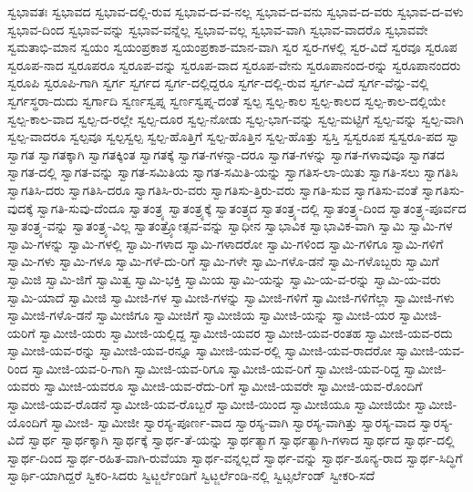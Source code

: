 {ಸ್ವಭಾವತಃ
ಸ್ವಭಾವದ
ಸ್ವಭಾವ-ದಲ್ಲಿ-ರುವ
ಸ್ವಭಾವ-ದ-ವ-ನಲ್ಲ
ಸ್ವಭಾವ-ದ-ವನು
ಸ್ವಭಾವ-ದ-ವರು
ಸ್ವಭಾವ-ದ-ವಳು
ಸ್ವಭಾವ-ದಿಂದ
ಸ್ವಭಾವ-ವನ್ನು
ಸ್ವಭಾವ-ವನ್ನೆಲ್ಲ
ಸ್ವಭಾವ-ವಲ್ಲ
ಸ್ವಭಾವ-ವಾಗಿ
ಸ್ವಭಾವ-ವಾದರೊ
ಸ್ವಭಾವವೇ
ಸ್ವಮತಾಭಿ-ಮಾನ
ಸ್ವಯಂ
ಸ್ವಯಂಪ್ರಕಾಶ
ಸ್ವಯಂಪ್ರಕಾಶ-ಮಾನ-ವಾಗಿ
ಸ್ವರ
ಸ್ವರ-ಗಳಲ್ಲಿ
ಸ್ವರ-ವಿದೆ
ಸ್ವರವೂ
ಸ್ವರೂಪ
ಸ್ವರೂಪ-ನಾದ
ಸ್ವರೂಪರೂ
ಸ್ವರೂಪ-ವನ್ನು
ಸ್ವರೂಪ-ವಾದ
ಸ್ವರೂಪ-ವೇನು
ಸ್ವರೂಪಾನಂದ-ರನ್ನು
ಸ್ವರೂಪಾನಂದರು
ಸ್ವರೂಪಿ
ಸ್ವರೂಪಿ-ಗಾಗಿ
ಸ್ವರ್ಗ
ಸ್ವರ್ಗದ
ಸ್ವರ್ಗ-ದಲ್ಲಿದ್ದರೂ
ಸ್ವರ್ಗ-ದಲ್ಲಿ-ರುವ
ಸ್ವರ್ಗ-ವಿದೆ
ಸ್ವರ್ಗ-ವೆನ್ನು-ವಲ್ಲಿ
ಸ್ವರ್ಗಸ್ಥರಾ-ದುದು
ಸ್ವರ್ಗಾದಿ
ಸ್ವರ್ಣಸ್ವಪ್ನ
ಸ್ವರ್ಣಸ್ವಪ್ನ-ದಂತೆ
ಸ್ವಲ್ಪ
ಸ್ವಲ್ಪ-ಕಾಲ
ಸ್ವಲ್ಪ-ಕಾಲದ
ಸ್ವಲ್ಪ-ಕಾಲ-ದಲ್ಲಿಯೇ
ಸ್ವಲ್ಪ-ಕಾಲ-ವಾದ
ಸ್ವಲ್ಪ-ದ-ರಲ್ಲೇ
ಸ್ವಲ್ಪ-ದೂರ
ಸ್ವಲ್ಪ-ನೋಡು
ಸ್ವಲ್ಪ-ಭಾಗ-ವನ್ನು
ಸ್ವಲ್ಪ-ಮಟ್ಟಿಗೆ
ಸ್ವಲ್ಪ-ವನ್ನು
ಸ್ವಲ್ಪ-ವಾಗಿ
ಸ್ವಲ್ಪ-ವಾದರೂ
ಸ್ವಲ್ಪವೂ
ಸ್ವಲ್ಪಸ್ವಲ್ಪ
ಸ್ವಲ್ಪ-ಹೊತ್ತಿಗೆ
ಸ್ವಲ್ಪ-ಹೊತ್ತಿನ
ಸ್ವಲ್ಪ-ಹೊತ್ತು
ಸ್ವಸ್ತಿ
ಸ್ವಸ್ವರೂಪ
ಸ್ವಸ್ವರೂ-ಪದ
ಸ್ವಾ
ಸ್ವಾಗತ
ಸ್ವಾಗತಕ್ಕಾಗಿ
ಸ್ವಾಗತಕ್ಕಿಂತ
ಸ್ವಾಗತಕ್ಕೆ
ಸ್ವಾಗತ-ಗಳನ್ನಾ-ದರೂ
ಸ್ವಾಗತ-ಗಳನ್ನು
ಸ್ವಾಗತ-ಗಳಾವುವೂ
ಸ್ವಾಗತದ
ಸ್ವಾಗತ-ದಲ್ಲಿ
ಸ್ವಾಗತ-ವನ್ನು
ಸ್ವಾಗತ-ಸಮಿತಿಯ
ಸ್ವಾಗತ-ಸಮಿತಿ-ಯನ್ನು
ಸ್ವಾಗತಿಸ-ಲಾ-ಯಿತು
ಸ್ವಾಗತಿ-ಸಲು
ಸ್ವಾಗತಿಸಿ
ಸ್ವಾಗತಿಸಿ-ದರು
ಸ್ವಾಗತಿಸಿ-ದರೂ
ಸ್ವಾಗತಿಸಿ-ರು-ವರು
ಸ್ವಾಗತಿಸು-ತ್ತಿರು-ವರು
ಸ್ವಾಗತಿ-ಸುವ
ಸ್ವಾಗತಿಸು-ವಂತೆ
ಸ್ವಾಗತಿಸು-ವುದಕ್ಕೆ
ಸ್ವಾಗತಿ-ಸುವು-ದೆಂದೂ
ಸ್ವಾತಂತ್ರ್ಯ
ಸ್ವಾತಂತ್ರ್ಯಕ್ಕೆ
ಸ್ವಾತಂತ್ರ್ಯದ
ಸ್ವಾತಂತ್ರ್ಯ-ದಲ್ಲಿ
ಸ್ವಾತಂತ್ರ್ಯ-ದಿಂದ
ಸ್ವಾತಂತ್ರ್ಯ-ಪೂರ್ವದ
ಸ್ವಾತಂತ್ರ್ಯ-ವನ್ನು
ಸ್ವಾತಂತ್ರ್ಯ-ವಿಲ್ಲ
ಸ್ವಾತಂತ್ರ್ಯೋತ್ಸವ-ವನ್ನು
ಸ್ವಾಧೀನ
ಸ್ವಾಭಾವಿಕ
ಸ್ವಾಭಾವಿಕ-ವಾಗಿ
ಸ್ವಾಮಿ
ಸ್ವಾಮಿ-ಗಳ
ಸ್ವಾಮಿ-ಗಳನ್ನು
ಸ್ವಾಮಿ-ಗಳಲ್ಲಿ
ಸ್ವಾಮಿ-ಗಳಾದ
ಸ್ವಾಮಿ-ಗಳಾದರೋ
ಸ್ವಾಮಿ-ಗಳಿಂದ
ಸ್ವಾಮಿ-ಗಳಿಗೂ
ಸ್ವಾಮಿ-ಗಳಿಗೆ
ಸ್ವಾಮಿ-ಗಳು
ಸ್ವಾಮಿ-ಗಳೂ
ಸ್ವಾಮಿ-ಗಳೆ-ದು-ರಿಗೆ
ಸ್ವಾಮಿ-ಗಳೇ
ಸ್ವಾಮಿ-ಗಳೊ-ಡನೆ
ಸ್ವಾಮಿ-ಗಳೊಬ್ಬರು
ಸ್ವಾಮಿಗೆ
ಸ್ವಾಮಿಜಿ
ಸ್ವಾಮಿ-ಜಿಗೆ
ಸ್ವಾಮಿತ್ವ
ಸ್ವಾಮಿ-ಭಕ್ತಿ
ಸ್ವಾಮಿಯ
ಸ್ವಾಮಿ-ಯನ್ನು
ಸ್ವಾಮಿ-ಯ-ವ-ರನ್ನು
ಸ್ವಾಮಿ-ಯ-ವರು
ಸ್ವಾಮಿ-ಯಾದೆ
ಸ್ವಾಮೀಜಿ
ಸ್ವಾಮೀಜಿ-ಗಳ
ಸ್ವಾಮೀಜಿ-ಗಳನ್ನು
ಸ್ವಾಮೀಜಿ-ಗಳಿಗೆ
ಸ್ವಾಮೀಜಿ-ಗಳಿಗೆಲ್ಲಾ
ಸ್ವಾಮೀಜಿ-ಗಳು
ಸ್ವಾಮೀಜಿ-ಗಳೊ-ಡನೆ
ಸ್ವಾಮೀಜಿಗೂ
ಸ್ವಾಮೀಜಿಗೆ
ಸ್ವಾಮೀಜಿಯ
ಸ್ವಾಮೀಜಿ-ಯನ್ನು
ಸ್ವಾಮೀಜಿ-ಯರ
ಸ್ವಾಮೀಜಿ-ಯರಿಗೆ
ಸ್ವಾಮೀಜಿ-ಯರು
ಸ್ವಾಮೀಜಿ-ಯಲ್ಲಿದ್ದ
ಸ್ವಾಮೀಜಿ-ಯವರ
ಸ್ವಾಮೀಜಿ-ಯವ-ರಂತಹ
ಸ್ವಾಮೀಜಿ-ಯವ-ರದು
ಸ್ವಾಮೀಜಿ-ಯವ-ರನ್ನು
ಸ್ವಾಮೀಜಿ-ಯವ-ರನ್ನೂ
ಸ್ವಾಮೀಜಿ-ಯವ-ರಲ್ಲಿ
ಸ್ವಾಮೀಜಿ-ಯವ-ರಾದರೋ
ಸ್ವಾಮೀಜಿ-ಯವ-ರಿಂದ
ಸ್ವಾಮೀಜಿ-ಯವ-ರಿ-ಗಾಗಿ
ಸ್ವಾಮೀಜಿ-ಯವ-ರಿಗೂ
ಸ್ವಾಮೀಜಿ-ಯವ-ರಿಗೆ
ಸ್ವಾಮೀಜಿ-ಯವ-ರಿದ್ದ
ಸ್ವಾಮೀಜಿ-ಯವರು
ಸ್ವಾಮೀಜಿ-ಯವರೂ
ಸ್ವಾಮೀಜಿ-ಯವ-ರೆದು-ರಿಗೆ
ಸ್ವಾಮೀಜಿ-ಯವರೇ
ಸ್ವಾಮೀಜಿ-ಯವ-ರೊಂದಿಗೆ
ಸ್ವಾಮೀಜಿ-ಯವ-ರೊಡನೆ
ಸ್ವಾಮೀಜಿ-ಯವ-ರೊಬ್ಬರೆ
ಸ್ವಾಮೀಜಿ-ಯಿಂದ
ಸ್ವಾಮೀಜಿಯೂ
ಸ್ವಾಮೀಜಿಯೇ
ಸ್ವಾಮೀಜಿ-ಯೊಂದಿಗೆ
ಸ್ವಾಮೀಜಿ-
ಸ್ವಾಮೀಜೀ
ಸ್ವಾರಸ್ಯ-ಪೂರ್ಣ-ವಾದ
ಸ್ವಾರಸ್ಯ-ವಾಗಿ
ಸ್ವಾರಸ್ಯ-ವಾಗಿತ್ತು
ಸ್ವಾರಸ್ಯ-ವಾದ
ಸ್ವಾರಸ್ಯ-ವಿದೆ
ಸ್ವಾರ್ಥ
ಸ್ವಾರ್ಥಕ್ಕಾಗಿ
ಸ್ವಾರ್ಥಕ್ಕೆ
ಸ್ವಾರ್ಥ-ತೆ-ಯನ್ನು
ಸ್ವಾರ್ಥತ್ಯಾಗ
ಸ್ವಾರ್ಥತ್ಯಾಗಿ-ಗಳಾದ
ಸ್ವಾರ್ಥದ
ಸ್ವಾರ್ಥ-ದಲ್ಲಿ
ಸ್ವಾರ್ಥ-ದಿಂದ
ಸ್ವಾರ್ಥ-ರಹಿತ-ವಾಗಿ-ರುವೆಯಾ
ಸ್ವಾರ್ಥ-ವನ್ನಲ್ಲದೆ
ಸ್ವಾರ್ಥ-ವನ್ನು
ಸ್ವಾರ್ಥ-ಶೂನ್ಯ-ರಾದ
ಸ್ವಾರ್ಥ-ಸಿದ್ಧಿಗೆ
ಸ್ವಾರ್ಥಿ-ಯಾಗಿದ್ದರೆ
ಸ್ವಿಕರಿ-ಸಿದರು
ಸ್ವಿಟ್ಜರ್ಲೆಂಡಿಗೆ
ಸ್ವಿಟ್ಜರ್ಲೆಂಡಿ-ನಲ್ಲಿ
ಸ್ವಿಟ್ಸರ್ಲೆಂಡ್
ಸ್ವೀಕರಿ-ಸದೆ
}
